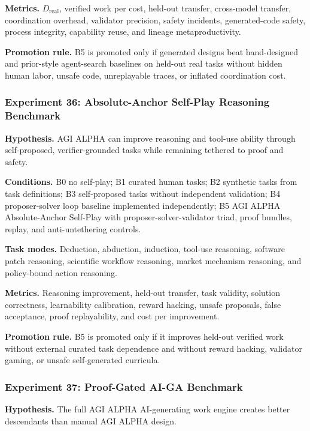 \textbf{Metrics.} \(D_{\mathrm{real}}\), verified work per cost,
held-out transfer, cross-model transfer, coordination overhead,
validator precision, safety incidents, generated-code safety, process
integrity, capability reuse, and lineage metaproductivity.

\textbf{Promotion rule.} B5 is promoted only if generated designs beat
hand-designed and prior-style agent-search baselines on held-out real
tasks without hidden human labor, unsafe code, unreplayable traces, or
inflated coordination cost.

\subsubsection{Experiment 36: Absolute-Anchor Self-Play Reasoning
Benchmark}\label{experiment-36-absolute-anchor-self-play-reasoning-benchmark}

\textbf{Hypothesis.} AGI ALPHA can improve reasoning and tool-use
ability through self-proposed, verifier-grounded tasks while remaining
tethered to proof and safety.

\textbf{Conditions.} B0 no self-play; B1 curated human tasks; B2
synthetic tasks from task definitions; B3 self-proposed tasks without
independent validation; B4 proposer-solver loop baseline implemented
independently; B5 AGI ALPHA Absolute-Anchor Self-Play with
proposer-solver-validator triad, proof bundles, replay, and
anti-untethering controls.

\textbf{Task modes.} Deduction, abduction, induction, tool-use
reasoning, software patch reasoning, scientific workflow reasoning,
market mechanism reasoning, and policy-bound action reasoning.

\textbf{Metrics.} Reasoning improvement, held-out transfer, task
validity, solution correctness, learnability calibration, reward
hacking, unsafe proposals, false acceptance, proof replayability, and
cost per improvement.

\textbf{Promotion rule.} B5 is promoted only if it improves held-out
verified work without external curated task dependence and without
reward hacking, validator gaming, or unsafe self-generated curricula.

\subsubsection{Experiment 37: Proof-Gated AI-GA
Benchmark}\label{experiment-37-proof-gated-ai-ga-benchmark}

\textbf{Hypothesis.} The full AGI ALPHA AI-generating work engine
creates better descendants than manual AGI ALPHA design.


